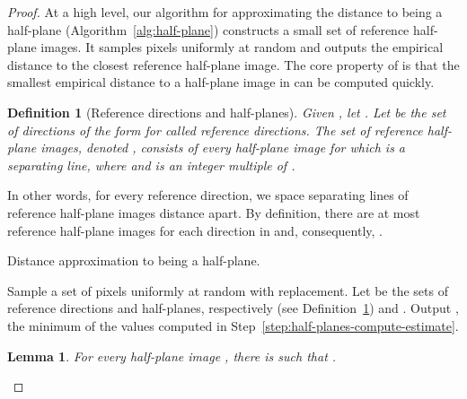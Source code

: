 \documentclass[11pt,english]{article}
\newtheorem{lemma}[theorem]{Lemma}
\newtheorem{definition}{Definition}[section]
\numberwithin{figure}{section}
\begin{document}
\begin{proof}
{\color{black}At a high level, our algorithm for approximating the distance to being a half-plane (Algorithm~\ref{alg:half-plane}) constructs a small set  of reference half-plane images. It samples pixels uniformly at random and outputs the empirical distance to the closest reference half-plane image. The core property of  is that the smallest empirical distance to a half-plane image in  can be computed quickly.

\begin{definition}[Reference directions and half-planes]\label{def:reference-half-planes}
Given , let . Let  be the set of directions of the form  for   called {\em reference directions}. The set of {\em reference half-plane images}, denoted , consists of every half-plane image for which  is a separating line, where  and  is an integer multiple of . \end{definition}
In other words, for every reference direction, we space separating lines of reference half-plane images distance  apart. By definition, there are at most  reference half-plane images for each direction in  and, consequently, .

\begin{algorithm}
\caption{Distance approximation to being a half-plane.}
\label{alg:half-plane}
\DontPrintSemicolon
\BlankLine
\nl Sample a set  of  pixels uniformly at random with replacement.\;
\nl Let  be the sets of reference directions and half-planes, respectively (see Definition~\ref{def:reference-half-planes}) and .\;
\nl\label{step:half-planes-foreach-dir} \ForEach {}
\nl Output , the minimum of the values computed in Step~\ref{step:half-planes-compute-estimate}.\;
\end{algorithm}


\begin{lemma}\label{lem:properties-of-reference-HP}
 For every half-plane image , there is  such that .
\end{lemma}

}
\end{proof}
\end{document}
